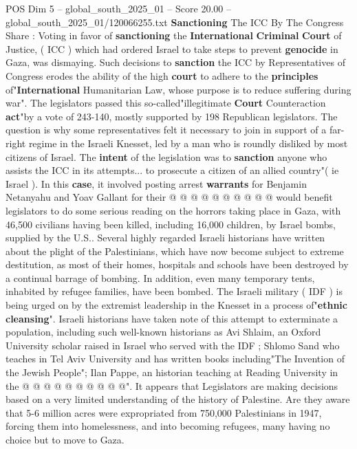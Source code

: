 \begin{textsample}{POS Dim 5 – global\_south\_2025\_01 – Score 20.00 – global\_south\_2025\_01/120066255.txt}  \label{ex:f5_pos_291}
\textbf{Sanctioning} The ICC By The Congress Share : Voting in favor of \textbf{sanctioning} the \textbf{International} \textbf{Criminal} \textbf{Court} of Justice, ( ICC ) which had ordered Israel to take steps to prevent \textbf{genocide} in Gaza, was dismaying.
Such decisions to \textbf{sanction} the ICC by Representatives of Congress erodes the ability of the high \textbf{court} to adhere to the \textbf{principles} of"\textbf{International} Humanitarian Law, whose purpose is to reduce suffering during war".
The legislators passed this so-called"illegitimate \textbf{Court} Counteraction \textbf{act}"by a vote of 243-140, mostly supported by 198 Republican legislators.
The question is why some representatives felt it necessary to join in support of a far-right regime in the Israeli Knesset, led by a man who is roundly disliked by most citizens of Israel.
The \textbf{intent} of the legislation was to \textbf{sanction} anyone who assists the ICC in its attempts... to prosecute a citizen of an allied country"( ie Israel ).
In this \textbf{case}, it involved posting arrest \textbf{warrants} for Benjamin Netanyahu and Yoav Gallant for their @ @ @ @ @ @ @ @ @ @ would benefit legislators to do some serious reading on the horrors taking place in Gaza, with 46,500 civilians having been killed, including 16,000 children, by Israel bombs, supplied by the U.S..
Several highly regarded Israeli historians have written about the plight of the Palestinians, which have now become subject to extreme destitution, as most of their homes, hospitals and schools have been destroyed by a continual barrage of bombing.
In addition, even many temporary tents, inhabited by refugee families, have been bombed.
The Israeli military ( IDF ) is being urged on by the extremist leadership in the Knesset in a process of"\textbf{ethnic} \textbf{cleansing}".
Israeli historians have taken note of this attempt to exterminate a population, including such well-known historians as Avi Shlaim, an Oxford University scholar raised in Israel who served with the IDF ; Shlomo Sand who teaches in Tel Aviv University and has written books including"The Invention of the Jewish People"; Ilan Pappe, an historian teaching at Reading University in the @ @ @ @ @ @ @ @ @ @".
It appears that Legislators are making decisions based on a very limited understanding of the history of Palestine.
Are they aware that 5-6 million acres were expropriated from 750,000 Palestinians in 1947, forcing them into homelessness, and into becoming refugees, many having no choice but to move to Gaza.

\end{textsample}

